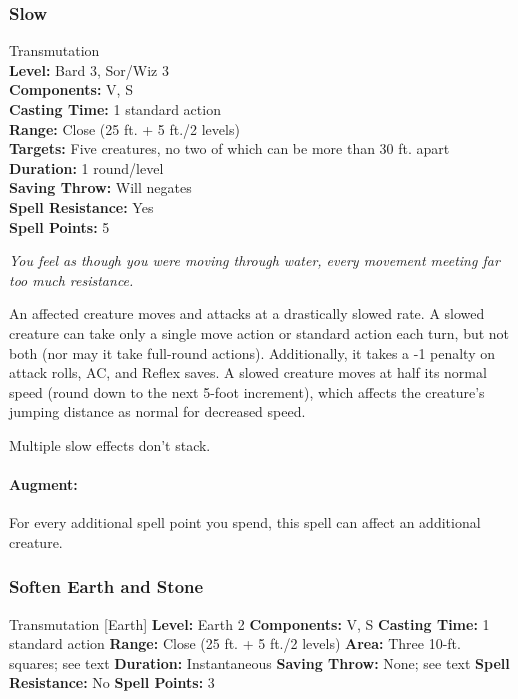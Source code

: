 \subsubsection{Slow}
\label{Spell:Slow}
Transmutation
\\ \textbf{Level:} Bard 3, Sor/Wiz 3
\\ \textbf{Components:} V, S
\\ \textbf{Casting Time:} 1 standard action
\\ \textbf{Range:} Close (25 ft. + 5 ft./2 levels)
\\ \textbf{Targets:} Five creatures, no two of which can be more than 30 ft. apart
\\ \textbf{Duration:} 1 round/level
\\ \textbf{Saving Throw:} Will negates
\\ \textbf{Spell Resistance:} Yes
\\ \textbf{Spell Points:} 5

\emph{You feel as though you were moving through water, every movement meeting far too much resistance.}

An affected creature moves and attacks at a drastically slowed rate. 
A slowed creature can take only a single move action or standard action each turn, 
but not both (nor may it take full-round actions). 
Additionally, it takes a -1 penalty on attack rolls, AC, and Reflex saves. 
A slowed creature moves at half its normal speed (round down to the next 5-foot increment), 
which affects the creature's jumping distance as normal for decreased speed.

Multiple slow effects don't stack.

\paragraph{Augment:} For every additional spell point you spend, this spell can affect an additional creature.

\subsubsection{Soften Earth and Stone}
\label{Spell:SoftenEarthAndStone}
Transmutation [Earth]
\textbf{Level:} Earth 2
\textbf{Components:} V, S
\textbf{Casting Time:} 1 standard action
\textbf{Range:} Close (25 ft. + 5 ft./2 levels)
\textbf{Area:} Three 10-ft. squares; see text
\textbf{Duration:} Instantaneous
\textbf{Saving Throw:} None; see text
\textbf{Spell Resistance:} No
\textbf{Spell Points:} 3

